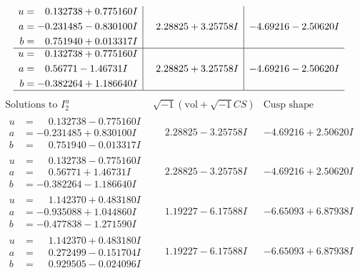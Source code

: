 \documentclass[1p]{elsarticle_modified}
\theoremstyle{definition}
\newcommand{\I}{\sqrt{-1}}
\begin{document}
$$\begin{array}{c|c|c}
\begin{aligned}
u &= \phantom{-}0.132738 + 0.775160 I \\
a &= -0.231485 - 0.830100 I \\
b &= \phantom{-}0.751940 + 0.013317 I\end{aligned}
 & \phantom{-}2.28825 + 3.25758 I & -4.69216 - 2.50620 I \\ \hline\begin{aligned}
u &= \phantom{-}0.132738 + 0.775160 I \\
a &= \phantom{-}0.56771 - 1.46731 I \\
b &= -0.382264 + 1.186640 I\end{aligned}
 & \phantom{-}2.28825 + 3.25758 I & -4.69216 - 2.50620 I\\
 \hline 
 \end{array}$$\newpage$$\begin{array}{c|c|c}  
\text{Solutions to }I^u_{2}& \I (\text{vol} + \sqrt{-1}CS) & \text{Cusp shape}\\
 \hline 
\begin{aligned}
u &= \phantom{-}0.132738 - 0.775160 I \\
a &= -0.231485 + 0.830100 I \\
b &= \phantom{-}0.751940 - 0.013317 I\end{aligned}
 & \phantom{-}2.28825 - 3.25758 I & -4.69216 + 2.50620 I \\ \hline\begin{aligned}
u &= \phantom{-}0.132738 - 0.775160 I \\
a &= \phantom{-}0.56771 + 1.46731 I \\
b &= -0.382264 - 1.186640 I\end{aligned}
 & \phantom{-}2.28825 - 3.25758 I & -4.69216 + 2.50620 I \\ \hline\begin{aligned}
u &= \phantom{-}1.142370 + 0.483180 I \\
a &= -0.935088 + 1.044860 I \\
b &= -0.477838 - 1.271590 I\end{aligned}
 & \phantom{-}1.19227 - 6.17588 I & -6.65093 + 6.87938 I \\ \hline\begin{aligned}
u &= \phantom{-}1.142370 + 0.483180 I \\
a &= \phantom{-}0.272499 - 0.151704 I \\
b &= \phantom{-}0.929505 - 0.024096 I\end{aligned}
 & \phantom{-}1.19227 - 6.17588 I & -6.65093 + 6.87938 I \\ \hline\begin{aligned}

\end{aligned}
\end{array}$$
\end{document}
